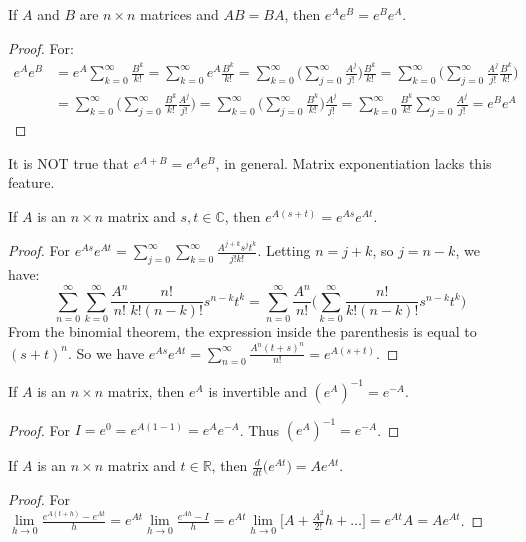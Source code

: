 \documentclass[crop=false,class=book,oneside]{standalone}
\begin{document}
\begin{theorem}
If $A$ and $B$ are $n\times n$ matrices and $AB = BA$, then $e^{A}e^{B} = e^{B}e^{A}$.
\end{theorem}
\begin{proof}
For:
\begin{align*}
    e^A e^B &= e^A\sum_{k=0}^{\infty}\frac{B^k}{k!}=\sum_{k=0}^{\infty} e^A\frac{B^k}{k!}= \sum_{k=0}^{\infty} \big(\sum_{j=0}^{\infty} \frac{A^j}{j!}\big) \frac{B^k}{k!}= \sum_{k=0}^{\infty}\big(\sum_{j=0}^{\infty} \frac{A^j}{j!}\frac{B^k}{k!}\big)\\
    &=\sum_{k=0}^{\infty}\big(\sum_{j=0}^{\infty} \frac{B^k}{k!}\frac{A^j}{j!}\big)=\sum_{k=0}^{\infty}\big(\sum_{j=0}^{\infty} \frac{B^k}{k!}\big)\frac{A^j}{j!}= \sum_{k=0}^{\infty}\frac{B^k}{k!}\sum_{j=0}^{\infty}\frac{A^j}{j!}=e^{B}e^{A}
\end{align*}
\end{proof}
It is NOT true that $e^{A+B}=e^{A}e^{B}$, in general. Matrix exponentiation lacks this feature.
\begin{theorem}
If $A$ is an $n\times n$ matrix and $s,t\in \mathbb{C}$, then $e^{A(s+t)} = e^{As}e^{At}$.
\end{theorem}
\begin{proof}
For $e^{As}e^{At} = \sum_{j=0}^{\infty} \sum_{k=0}^{\infty} \frac{A^{j+k}s^jt^k}{j!k!}$. Letting $n = j+k$, so $j = n-k$, we have:
\begin{equation*}
    \sum_{n=0}^{\infty} \sum_{k=0}^{\infty} \frac{A^n}{n!}\frac{n!}{k!(n-k)!}s^{n-k}t^k = \sum_{n=0}^{\infty}\frac{A^n}{n!}\big(\sum_{k=0}^{\infty} \frac{n!}{k!(n-k)!}s^{n-k}t^k\big)    
\end{equation*}
From the binomial theorem, the expression inside the parenthesis is equal to $(s+t)^n$. So we have $e^{As}e^{At}=\sum_{n=0}^{\infty} \frac{A^n(t+s)^n}{n!} = e^{A(s+t)}$.
\end{proof}
\begin{theorem}
If $A$ is an $n\times n$ matrix, then $e^A$ is invertible and $(e^A)^{-1} = e^{-A}$.
\end{theorem}
\begin{proof}
For $I = e^{0} = e^{A(1-1)} = e^Ae^{-A}$. Thus $(e^{A})^{-1} = e^{-A}$.
\end{proof}
\begin{theorem}
If $A$ is an $n\times n$ matrix and $t\in \mathbb{R}$, then $\frac{d}{dt}\big(e^{At}\big) = Ae^{At}$.
\end{theorem}
\begin{proof}
For $\underset{h\rightarrow 0}\lim \frac{e^{A(t+h)}-e^{At}}{h} = e^{At}\underset{h\rightarrow 0}\lim \frac{e^{Ah}-I}{h} = e^{At}\underset{h\rightarrow 0}\lim\big[A+\frac{A^2}{2!}h+\hdots\big] = e^{At}A = Ae^{At}$.
\end{proof}
\end{document}
